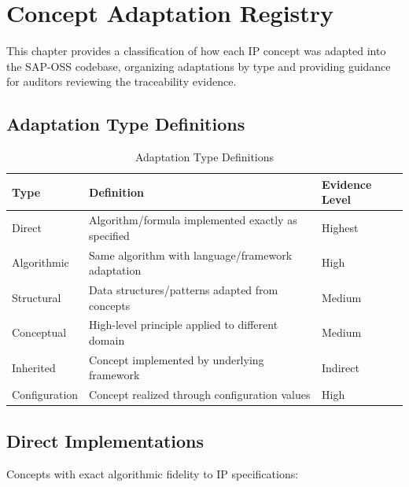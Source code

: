 
\chapter{Concept Adaptation Registry}
\label{chap:adaptation-registry}

This chapter provides a classification of how each IP concept was adapted into the SAP-OSS codebase, organizing adaptations by type and providing guidance for auditors reviewing the traceability evidence.

\section{Adaptation Type Definitions}

\begin{table}[H]
\centering
\caption{Adaptation Type Definitions}
\label{tab:adaptation-types}
\begin{tabularx}{\textwidth}{@{}lXl@{}}
\toprule
\textbf{Type} & \textbf{Definition} & \textbf{Evidence Level} \\
\midrule
Direct & Algorithm/formula implemented exactly as specified & Highest \\
Algorithmic & Same algorithm with language/framework adaptation & High \\
Structural & Data structures/patterns adapted from concepts & Medium \\
Conceptual & High-level principle applied to different domain & Medium \\
Inherited & Concept implemented by underlying framework & Indirect \\
Configuration & Concept realized through configuration values & High \\
\bottomrule
\end{tabularx}
\end{table}

\section{Direct Implementations}

Concepts with exact algorithmic fidelity to IP specifications:

